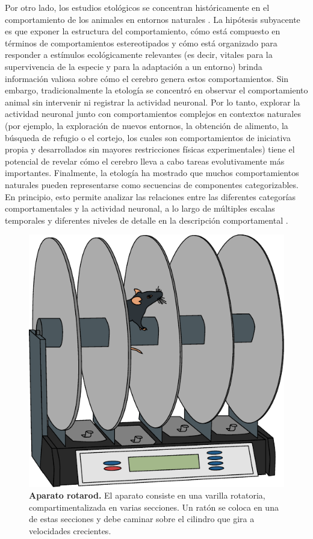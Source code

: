 Por otro lado, los estudios etológicos se concentran históricamente en el comportamiento de los animales en entornos naturales \cite{tinbergen_instinct}. La hipótesis subyacente es que exponer la estructura del comportamiento, cómo está compuesto en términos de comportamientos estereotipados y cómo está organizado para responder a estímulos ecológicamente relevantes (es decir, vitales para la supervivencia de la especie y para la adaptación a un entorno) brinda información valiosa sobre cómo el cerebro genera estos comportamientos. Sin embargo, tradicionalmente la etología se concentró en observar el comportamiento animal sin intervenir ni registrar la actividad neuronal. Por lo tanto, explorar la actividad neuronal junto con comportamientos complejos en contextos naturales (por ejemplo, la exploración de nuevos entornos, la obtención de alimento, la búsqueda de refugio o el cortejo, los cuales son comportamientos de iniciativa propia y desarrollados sin mayores restricciones físicas experimentales) tiene el potencial de revelar cómo el cerebro lleva a cabo tareas evolutivamente más importantes. Finalmente, la etología ha mostrado que muchos comportamientos naturales pueden representarse como secuencias de componentes categorizables. En principio, esto permite analizar las relaciones entre las diferentes categorías comportamentales y la actividad neuronal, a lo largo de múltiples escalas temporales y diferentes niveles de detalle en la descripción comportamental \cite{datta_computational_neuroethology, anderson_toward_a_science}.

\clearpage

\begin{figure}[htbp]
    \centering
    \includegraphics[width=0.5\linewidth]{figuras/capitulo1/rotarod.pdf}
    \caption{\textbf{Aparato rotarod.} El aparato consiste en una varilla rotatoria, compartimentalizada en varias secciones. Un ratón se coloca en una de estas secciones y debe caminar sobre el cilindro que gira a velocidades crecientes.}
    \label{fig:capitulo1_rotarod}
\end{figure}

